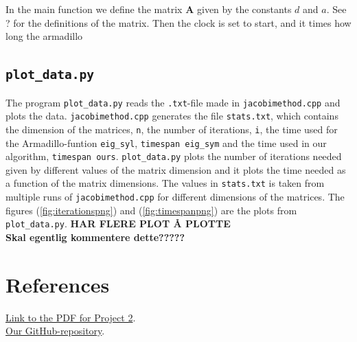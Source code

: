 \documentclass{article}
\begin{document}
In the main function we define the matrix \textbf{A} given by the constants $d$ and $a$. See ? for the definitions of the matrix. Then the clock is set to start, and it times how long the armadillo \\



\subsection{\texttt{plot\_data.py}}

The program \texttt{plot\_data.py} reads the \texttt{.txt}-file made in \texttt{jacobimethod.cpp} and plots the data. \texttt{jacobimethod.cpp} generates the file \texttt{stats.txt}, which contains the dimension of the matrices, \texttt{n}, the number of iterations, \texttt{i}, the time used for the Armadillo-funtion \texttt{eig\_syl}, \texttt{timespan eig\_sym} and the time used in our algorithm, \texttt{timespan ours}.
\texttt{plot\_data.py} plots the number of iterations needed given by different values of the matrix dimension and it plots the time needed as a function of the matrix dimensions. The values in \texttt{stats.txt} is taken from multiple runs of \texttt{jacobimethod.cpp} for different dimensions of the matrices. The figures (\ref{fig:iterationspng}) and (\ref{fig:timespanpng}) are the plots from \texttt{plot\_data.py}. \textbf{HAR FLERE PLOT Å PLOTTE} \\

\textbf{Skal egentlig kommentere dette?????} \\






\vspace{1cm}

\section{References} \label{sec:References}

\href{https://github.com/CompPhysics/ComputationalPhysics/blob/master/doc/Projects/2019/Project2/pdf/Project2.pdf}{Link to the PDF for Project 2}. \\

\href{https://github.com/Erikbgram/Fys3150}{Our GitHub-repository}. \\
\end{document}

